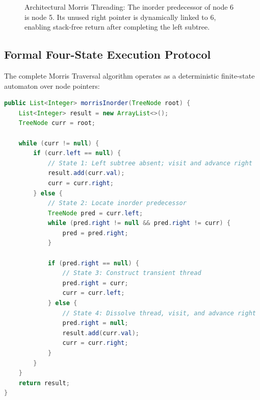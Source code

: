 \documentclass[10pt,twocolumn,letterpaper]{article}
\begin{document}
\begin{figure}[htbp]
\centering
{}
\caption{Architectural Morris Threading: The inorder predecessor of node 6 is node 5. Its unused right pointer is dynamically linked to 6, enabling stack-free return after completing the left subtree.}
\label{fig:morris-thread}
\end{figure}

\subsection{Formal Four-State Execution Protocol}

The complete Morris Traversal algorithm operates as a deterministic finite-state automaton over node pointers:

\begin{lstlisting}[language=Java,caption={Production Morris Inorder Traversal in Java}]
public List<Integer> morrisInorder(TreeNode root) {
    List<Integer> result = new ArrayList<>();
    TreeNode curr = root;

    while (curr != null) {
        if (curr.left == null) {
            // State 1: Left subtree absent; visit and advance right
            result.add(curr.val);
            curr = curr.right;
        } else {
            // State 2: Locate inorder predecessor
            TreeNode pred = curr.left;
            while (pred.right != null && pred.right != curr) {
                pred = pred.right;
            }

            if (pred.right == null) {
                // State 3: Construct transient thread
                pred.right = curr;
                curr = curr.left;
            } else {
                // State 4: Dissolve thread, visit, and advance right
                pred.right = null;
                result.add(curr.val);
                curr = curr.right;
            }
        }
    }
    return result;
}
\end{lstlisting}
\end{document}
